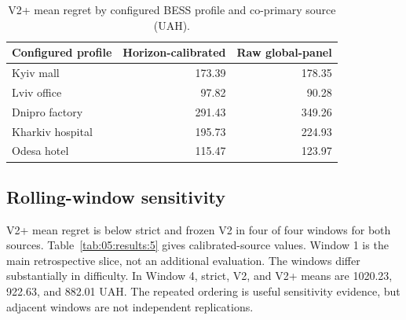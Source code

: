 \begin{table}[t]
\centering
\caption{V2+ mean regret by configured BESS profile and co-primary source (UAH).}
\label{tab:05:results:4}
\small
\begin{tabularx}{\columnwidth}{@{}Yrr@{}}
\toprule
Configured profile & Horizon-calibrated & Raw global-panel \\
\midrule
Kyiv mall & 173.39 & 178.35 \\
Lviv office & 97.82 & 90.28 \\
Dnipro factory & 291.43 & 349.26 \\
Kharkiv hospital & 195.73 & 224.93 \\
Odesa hotel & 115.47 & 123.97 \\
\bottomrule
\end{tabularx}
\end{table}

\subsection{Rolling-window sensitivity}

V2+ mean regret is below strict and frozen V2 in four of four windows for both sources. Table~\ref{tab:05:results:5} gives calibrated-source values. Window 1 is the main retrospective slice, not an additional evaluation. The windows differ substantially in difficulty. In Window 4, strict, V2, and V2+ means are 1020.23, 922.63, and 882.01 UAH. The repeated ordering is useful sensitivity evidence, but adjacent windows are not independent replications.

\begin{table}[t]
\centering
\caption{Rolling-window sensitivity for horizon-calibrated NBEATSx.}
\label{tab:05:results:5}
\small
{}
\end{table}

